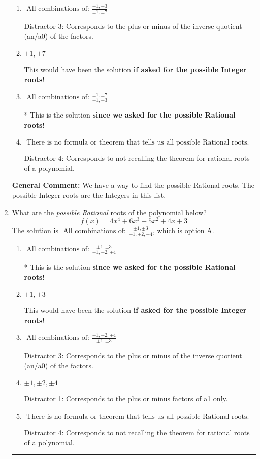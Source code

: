 \documentclass{extbook}[14pt]
\newcommand{\litem}[1]{\item #1

\rule{\textwidth}{0.4pt}}
\begin{document}
\begin{enumerate}
{\begin{enumerate}[label=\Alph*.]
 Distractor 1: Corresponds to the plus or minus factors of a1 only.
\item \( \text{ All combinations of: }\frac{\pm 1,\pm 3}{\pm 1,\pm 7} \)

 Distractor 3: Corresponds to the plus or minus of the inverse quotient (an/a0) of the factors. 
\item \( \pm 1,\pm 7 \)

This would have been the solution \textbf{if asked for the possible Integer roots}!
\item \( \text{ All combinations of: }\frac{\pm 1,\pm 7}{\pm 1,\pm 3} \)

* This is the solution \textbf{since we asked for the possible Rational roots}!
\item \( \text{ There is no formula or theorem that tells us all possible Rational roots.} \)

 Distractor 4: Corresponds to not recalling the theorem for rational roots of a polynomial.
\end{enumerate}

\textbf{General Comment:} We have a way to find the possible Rational roots. The possible Integer roots are the Integers in this list.
}
\litem{
What are the \textit{possible Rational} roots of the polynomial below?
\[ f(x) = 4x^{4} +6 x^{3} +5 x^{2} +4 x + 3 \]The solution is \( \text{ All combinations of: }\frac{\pm 1,\pm 3}{\pm 1,\pm 2,\pm 4} \), which is option A.\begin{enumerate}[label=\Alph*.]
\item \( \text{ All combinations of: }\frac{\pm 1,\pm 3}{\pm 1,\pm 2,\pm 4} \)

* This is the solution \textbf{since we asked for the possible Rational roots}!
\item \( \pm 1,\pm 3 \)

This would have been the solution \textbf{if asked for the possible Integer roots}!
\item \( \text{ All combinations of: }\frac{\pm 1,\pm 2,\pm 4}{\pm 1,\pm 3} \)

 Distractor 3: Corresponds to the plus or minus of the inverse quotient (an/a0) of the factors. 
\item \( \pm 1,\pm 2,\pm 4 \)

 Distractor 1: Corresponds to the plus or minus factors of a1 only.
\item \( \text{ There is no formula or theorem that tells us all possible Rational roots.} \)

 Distractor 4: Corresponds to not recalling the theorem for rational roots of a polynomial.
\end{enumerate}

}
\end{enumerate}
\end{document}
